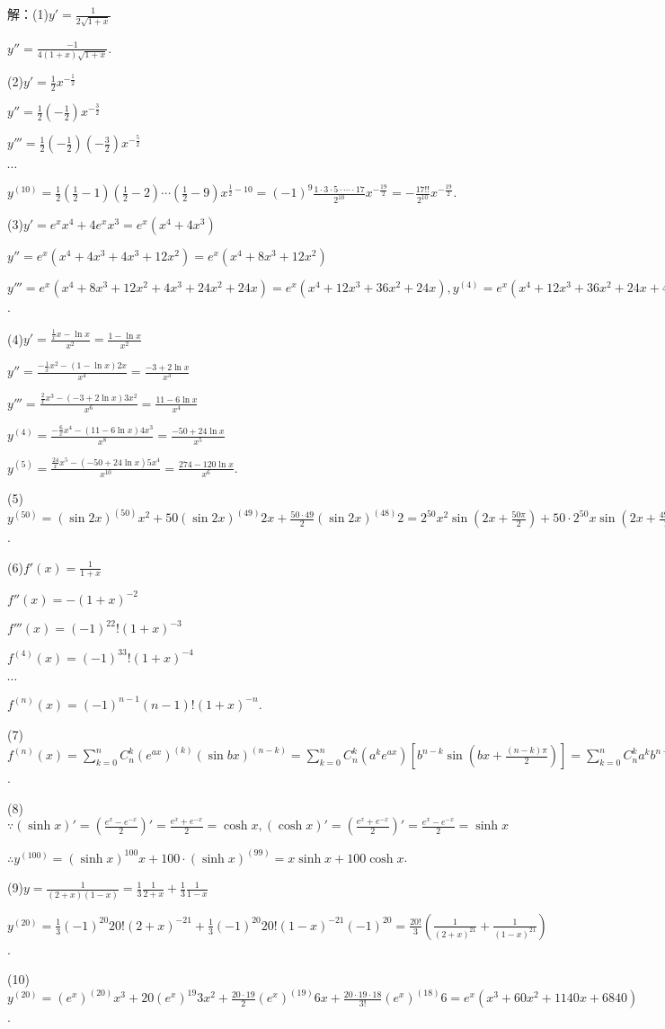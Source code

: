 \documentclass[12pt,UTF8]{ctexart}
\begin{document}
\begin{enumerate}
解：(1)$y'=\frac1{2\sqrt{1+x}}$

$y''=\frac{-1}{4(1+x)\sqrt{1+x}}$.

(2)$y'=\frac12x^{-\frac12}$

$y''=\frac12(-\frac12)x^{-\frac32}$

$y'''=\frac12(-\frac12)(-\frac32)x^{-\frac52}$

$\cdots$

$y^{(10)}=\frac12(\frac12-1)(\frac12-2)\cdots(\frac12-9)x^{\frac12-10}=(-1)^9\frac{1\cdot3\cdot5\cdot\cdots\cdot17}{2^{10}}x^{-\frac{19}2}=-\frac{17!!}{2^{10}}x^{-\frac{19}2}$.

(3)$y'=e^xx^4+4e^xx^3=e^x(x^4+4x^3)$

$y''=e^x(x^4+4x^3+4x^3+12x^2)=e^x(x^4+8x^3+12x^2)$

$y'''=e^x(x^4+8x^3+12x^2+4x^3+24x^2+24x)=e^x(x^4+12x^3+36x^2+24x),y^{(4)}=e^x(x^4+12x^3+36x^2+24x+4x^3+36x^2+72x+24)=e^x(x^4+16x^3+72x^2+96x+24)$.

(4)$y'=\frac{\frac1xx-\ln x}{x^2}=\frac{1-\ln x}{x^2}$

$y''=\frac{-\frac1xx^2-(1-\ln x)2x}{x^4}=\frac{-3+2\ln x}{x^3}$

$y'''=\frac{\frac2xx^3-(-3+2\ln x)3x^2}{x^6}=\frac{11-6\ln x}{x^4}$

$y^{(4)}=\frac{-\frac6xx^4-(11-6\ln x)4x^3}{x^8}=\frac{-50+24\ln x}{x^5}$

$y^{(5)}=\frac{\frac{24}xx^5-(-50+24\ln x)5x^4}{x^{10}}=\frac{274-120\ln x}{x^{6}}$.

(5)$y^{(50)}=(\sin2x)^{(50)}x^2+50(\sin2x)^{(49)}2x+\frac{50\cdot49}2(\sin2x)^{(48)}2=2^{50}x^2\sin(2x+\frac{50\pi}2)+50\cdot2^{50}x\sin(2x+\frac{49\pi}2)+50\cdot49\cdot2^{48}\sin(2x+\frac{48\pi}2)=-2^{50}x^2\sin2x+50\cdot2^{50}x\cos2x+50\cdot49\cdot2^{48}\sin2x$.

(6)$f'(x)=\frac1{1+x}$

$f''(x)=-(1+x)^{-2}$

$f'''(x)=(-1)^22!(1+x)^{-3}$

$f^{(4)}(x)=(-1)^33!(1+x)^{-4}$

$\cdots$

$f^{(n)}(x)=(-1)^{n-1}(n-1)!(1+x)^{-n}$.

(7)$f^{(n)}(x)=\sum_{k=0}^nC_n^k(e^{ax})^{(k)}(\sin bx)^{(n-k)}=\sum_{k=0}^nC_n^k(a^ke^{ax})[b^{n-k}\sin(bx+\frac{(n-k)\pi}2)]=\sum_{k=0}^nC_n^ka^kb^{n-k}e^{ax}\sin(bx+\frac{(n-k)\pi}2)$.

(8)$\because(\sinh x)'=(\frac{e^x-e^{-x}}2)'=\frac{e^x+e^{-x}}2=\cosh x,(\cosh x)'=(\frac{e^x+e^{-x}}2)'=\frac{e^x-e^{-x}}2=\sinh x$

$\therefore y^{(100)}=(\sinh x)^{100}x+100\cdot(\sinh x)^{(99)}=x\sinh x+100\cosh x$.

(9)$y=\frac1{(2+x)(1-x)}=\frac13\frac1{2+x}+\frac13\frac1{1-x}$

$y^{(20)}=\frac13(-1)^{20}20!(2+x)^{-21}+\frac13(-1)^{20}20!(1-x)^{-21}(-1)^{20}=\frac{20!}3(\frac1{(2+x)^{21}}+\frac1{(1-x)^{21}})$.

(10)$y^{(20)}=(e^x)^{(20)}x^3+20(e^{x})^{19}3x^2+\frac{20\cdot19}2(e^x)^{(19)}6x+\frac{20\cdot19\cdot18}{3!}(e^x)^{(18)}6=e^x(x^3+60x^2+1140x+6840)$.
\end{enumerate}
\end{document}
